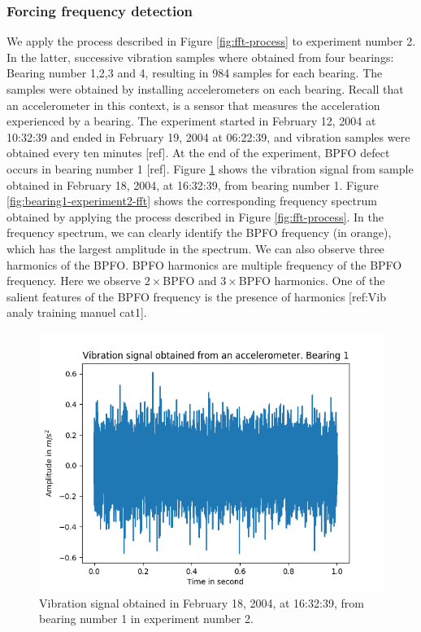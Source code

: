 \documentclass[../Main/thesis.tex]{subfiles}
\begin{document}
\subsubsection{Forcing frequency detection}
We apply the process described in Figure \ref{fig:fft-process} to experiment number 2.
In the latter, successive vibration samples where obtained from four bearings: Bearing number 1,2,3 and 4, resulting in 984 samples for each bearing.  
The samples were obtained by installing accelerometers on each bearing. Recall that an accelerometer in this context, is a sensor that measures the acceleration experienced by a bearing.
The experiment started in February 12, 2004 at 10:32:39 and ended in February 19, 2004 at 06:22:39, and vibration samples were obtained every ten minutes [ref].
At the end of the experiment, BPFO defect occurs in bearing number 1 [ref]. Figure \ref{fig:bearing1-experiment2} shows the vibration signal from sample obtained in  February 18, 2004, at 16:32:39, from bearing number 1. Figure \ref{fig:bearing1-experiment2-fft} shows the corresponding frequency spectrum obtained by applying the process described in Figure \ref{fig:fft-process}.
\justify
In the frequency spectrum, we can clearly identify the BPFO frequency (in orange), which has the largest amplitude in the spectrum. We can also observe three harmonics of the BPFO. BPFO harmonics are multiple frequency of the BPFO frequency. Here we observe $2\times$BPFO and $3\times$BPFO harmonics. One of the salient features of the BPFO frequency is the presence of harmonics [ref:Vib analy training manuel cat1]. 
\begin{figure}[H] %
   \centering
   \includegraphics[width=4.9in]{../fig/experiment2_bearing1.png} 
   \caption{Vibration signal obtained in February 18, 2004, at 16:32:39, from bearing number 1 in  experiment number 2.}
   \label{fig:bearing1-experiment2}
\end{figure}
\end{document}
